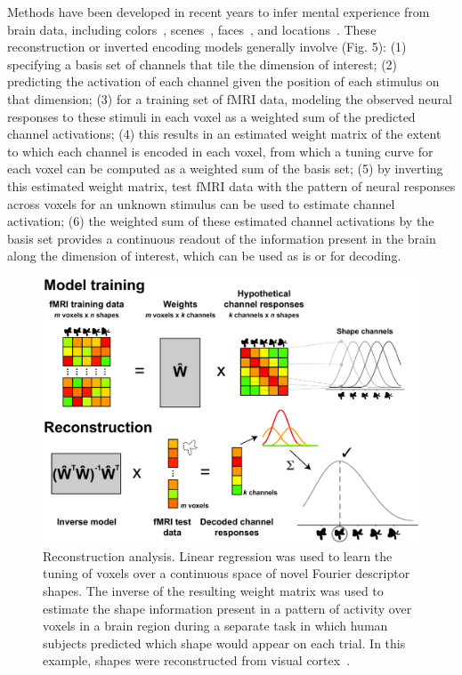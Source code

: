 Methods have been developed in recent years to infer
mental experience from brain data, including
colors~\citep{Brouwer:2009}, scenes~\citep{Naselaris:2009},
faces~\citep{Cowen:2014}, and locations~\citep{Sprague:2016}. These 
reconstruction or inverted encoding models generally
involve (Fig. 5): (1) specifying a basis set of channels that tile the
dimension of interest; (2) predicting the activation of each
channel given the position of each stimulus on that dimension; 
(3) for a training set of fMRI data, modeling the observed neural 
responses to these stimuli in each voxel as a weighted
sum of the predicted channel activations; (4) this results in an
estimated weight matrix of the extent to which each channel is encoded
in each voxel, from which a tuning curve for each voxel can be
computed as a weighted sum of the basis set; (5) by inverting this
estimated weight matrix, test fMRI data with the pattern of neural
responses across voxels for an unknown stimulus can be used to
estimate channel activation; (6) the weighted sum of these estimated
channel activations by the basis set provides a continuous readout of
the information present in the brain along the dimension of interest,
which can be used as is or for decoding.

\setlength{\columnsep}{20pt}
\begin{figure}
\centering
\includegraphics[width=.48\textwidth]{figs/inverse}
\caption{\small Reconstruction analysis. Linear regression was
used to learn the tuning of voxels over a continuous space of novel
Fourier descriptor shapes. The inverse of the resulting weight matrix
was used to estimate the shape information present in a pattern of
activity over voxels in a brain region during a separate task in which
human subjects predicted which shape would appear on each trial.
In this example, shapes were reconstructed from visual cortex~\citep{Kok:2018}.}
    \label{fig:inverse}
    \vskip2pt
\end{figure}

